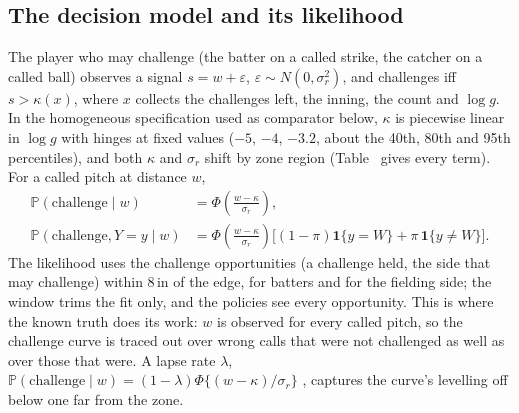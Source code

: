 \documentclass[aoas]{imsart}
\theoremstyle{plain}
\theoremstyle{definition}
\newcommand{\Prob}{\mathbb{P}}
\begin{document}
\subsection{The decision model and its likelihood}
The player who may challenge (the batter on a called strike, the catcher on a called ball) observes a signal
$s=w+\varepsilon$, $\varepsilon\sim N(0,\sigma_{r}^2)$, and challenges iff $s>\kappa(x)$, where $x$ collects the
challenges left, the inning, the count and $\log g$. In the homogeneous specification used as comparator below, $\kappa$ is piecewise linear in
$\log g$ with hinges at fixed values ($-5$, $-4$, $-3.2$, about the 40th, 80th and 95th percentiles), and both $\kappa$
and $\sigma_r$ shift by zone region (Table~ gives every term). For a called pitch at distance $w$,
\begin{equation}\label{eq:pch}
\begin{aligned}
\Prob(\text{challenge}\mid w)&=\Phi\!\left(\frac{w-\kappa}{\sigma_r}\right),\\
\Prob(\text{challenge}, Y=y\mid w)&=\Phi\!\left(\frac{w-\kappa}{\sigma_r}\right)\bigl[(1-\pi)\mathbf 1\{y=W\}+\pi\,\mathbf 1\{y\ne W\}\bigr].
\end{aligned}
\end{equation}
The likelihood uses the challenge opportunities (a challenge held, the side that may challenge) within 8\,in of the
edge, \NLikBatter{} for batters and \NLikCatcher{} for the fielding side; the window trims the fit only, and the
policies see every opportunity. This is where the known truth does its work: $w$ is observed for every called pitch, so
the challenge curve is traced out over wrong calls that were not challenged as well as over those that were. A lapse
rate $\lambda$, $\Prob(\text{challenge}\mid w)=(1-\lambda)\Phi\{(w-\kappa)/\sigma_r\}$ \citep{WichmannHill2001},
captures the curve's levelling off below one far from the zone.
\end{document}
